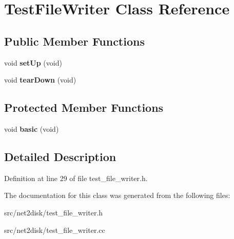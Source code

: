 \hypertarget{class_test_file_writer}{
\section{TestFileWriter Class Reference}
\label{class_test_file_writer}
}
\subsection*{Public Member Functions}
\begin{DoxyCompactItemize}
\item 
\hypertarget{class_test_file_writer_ae1da41e8a7dc586fa1808bb571cc862f}{
void {\bfseries setUp} (void)}
\label{class_test_file_writer_ae1da41e8a7dc586fa1808bb571cc862f}

\item 
\hypertarget{class_test_file_writer_a781b236ff9d9825e6c6762b46d00692a}{
void {\bfseries tearDown} (void)}
\label{class_test_file_writer_a781b236ff9d9825e6c6762b46d00692a}

\end{DoxyCompactItemize}
\subsection*{Protected Member Functions}
\begin{DoxyCompactItemize}
\item 
\hypertarget{class_test_file_writer_a3d5ec3a23f38b47b04dd648a2802ab5f}{
void {\bfseries basic} (void)}
\label{class_test_file_writer_a3d5ec3a23f38b47b04dd648a2802ab5f}

\end{DoxyCompactItemize}


\subsection{Detailed Description}


Definition at line 29 of file test\_\-file\_\-writer.h.



The documentation for this class was generated from the following files:\begin{DoxyCompactItemize}
\item 
src/net2disk/test\_\-file\_\-writer.h\item 
src/net2disk/test\_\-file\_\-writer.cc\end{DoxyCompactItemize}
